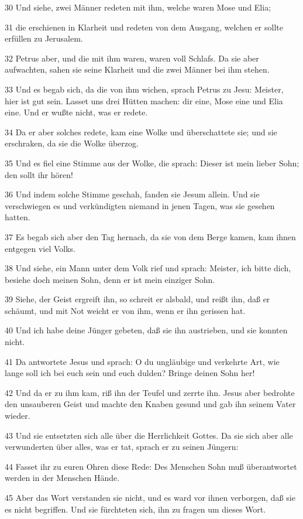 \par 30 Und siehe, zwei Männer redeten mit ihm, welche waren Mose und Elia;
\par 31 die erschienen in Klarheit und redeten von dem Ausgang, welchen er sollte erfüllen zu Jerusalem.
\par 32 Petrus aber, und die mit ihm waren, waren voll Schlafs. Da sie aber aufwachten, sahen sie seine Klarheit und die zwei Männer bei ihm stehen.
\par 33 Und es begab sich, da die von ihm wichen, sprach Petrus zu Jesu: Meister, hier ist gut sein. Lasset uns drei Hütten machen: dir eine, Mose eine und Elia eine. Und er wußte nicht, was er redete.
\par 34 Da er aber solches redete, kam eine Wolke und überschattete sie; und sie erschraken, da sie die Wolke überzog.
\par 35 Und es fiel eine Stimme aus der Wolke, die sprach: Dieser ist mein lieber Sohn; den sollt ihr hören!
\par 36 Und indem solche Stimme geschah, fanden sie Jesum allein. Und sie verschwiegen es und verkündigten niemand in jenen Tagen, was sie gesehen hatten.
\par 37 Es begab sich aber den Tag hernach, da sie von dem Berge kamen, kam ihnen entgegen viel Volks.
\par 38 Und siehe, ein Mann unter dem Volk rief und sprach: Meister, ich bitte dich, besiehe doch meinen Sohn, denn er ist mein einziger Sohn.
\par 39 Siehe, der Geist ergreift ihn, so schreit er alsbald, und reißt ihn, daß er schäumt, und mit Not weicht er von ihm, wenn er ihn gerissen hat.
\par 40 Und ich habe deine Jünger gebeten, daß sie ihn austrieben, und sie konnten nicht.
\par 41 Da antwortete Jesus und sprach: O du ungläubige und verkehrte Art, wie lange soll ich bei euch sein und euch dulden? Bringe deinen Sohn her!
\par 42 Und da er zu ihm kam, riß ihn der Teufel und zerrte ihn. Jesus aber bedrohte den unsauberen Geist und machte den Knaben gesund und gab ihn seinem Vater wieder.
\par 43 Und sie entsetzten sich alle über die Herrlichkeit Gottes. Da sie sich aber alle verwunderten über alles, was er tat, sprach er zu seinen Jüngern:
\par 44 Fasset ihr zu euren Ohren diese Rede: Des Menschen Sohn muß überantwortet werden in der Menschen Hände.
\par 45 Aber das Wort verstanden sie nicht, und es ward vor ihnen verborgen, daß sie es nicht begriffen. Und sie fürchteten sich, ihn zu fragen um dieses Wort.
